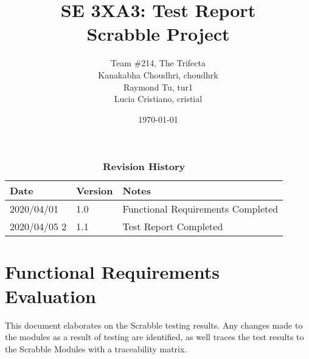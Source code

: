 \documentclass[12pt, titlepage]{article}
\title{SE 3XA3: Test Report\\Scrabble Project}
\author{Team \#214, The Trifecta
		\\Kanakabha Choudhri, choudhrk
		\\ Raymond Tu, tur1
		\\ Lucia Cristiano, cristial
}
\date{\today}
\begin{document}
\maketitle

\tableofcontents
\listoftables
\listoffigures

\begin{table}[bp]
\caption{\bf Revision History}
\begin{tabularx}{\textwidth}{p{3cm}p{2cm}X}
\toprule {\bf Date} & {\bf Version} & {\bf Notes}\\
\midrule
2020/04/01 & 1.0 & Functional Requirements Completed\\
2020/04/05 2 & 1.1 & Test Report Completed\\
\bottomrule
\end{tabularx}
\end{table}

\newpage


\section{Functional Requirements Evaluation}

This document elaborates on the Scrabble testing results. Any changes made to the modules as a result of testing are identified, as well traces the test results to the Scrabble Modules with a traceability matrix.
\end{document}

